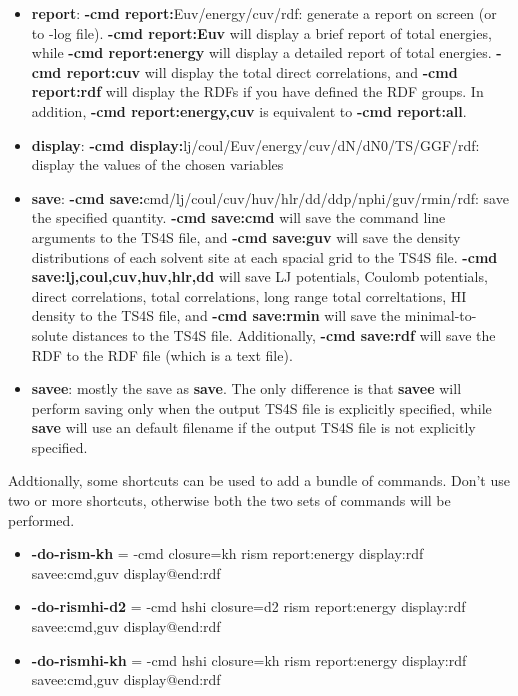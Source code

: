 \documentclass[aip,amsmath,amssymb,reprint,onecolumn]{revtex4-1}
\begin{document}
\begin{itemize}
    \item {\bf report}: {\bf -cmd report:}Euv/energy/cuv/rdf: generate a report on screen (or to -log file). {\bf -cmd report:Euv} will display a brief report of total energies, while {\bf -cmd report:energy} will display a detailed report of total energies. {\bf -cmd report:cuv} will display the total direct correlations, and {\bf -cmd report:rdf} will display the RDFs if you have defined the RDF groups. In addition, {\bf -cmd report:energy,cuv} is equivalent to {\bf -cmd report:all}.
    \item {\bf display}: {\bf -cmd display:}lj/coul/Euv/energy/cuv/dN/dN0/TS/GGF/rdf: display the values of the chosen variables
    \item {\bf save}: {\bf -cmd save:}cmd/lj/coul/cuv/huv/hlr/dd/ddp/nphi/guv/rmin/rdf: save the specified quantity. {\bf -cmd save:cmd} will save the command line arguments to the TS4S file, and {\bf -cmd save:guv} will save the density distributions of each solvent site at each spacial grid to the TS4S file. {\bf -cmd save:lj,coul,cuv,huv,hlr,dd} will save LJ potentials, Coulomb potentials, direct correlations, total correlations, long range total correltations, HI density to the TS4S file, and {\bf -cmd save:rmin} will save the minimal-to-solute distances to the TS4S file. Additionally, {\bf -cmd save:rdf} will save the RDF to the RDF file (which is a text file).
    \item {\bf savee}: mostly the save as {\bf save}. The only difference is that {\bf savee} will perform saving only when the output TS4S file is explicitly specified, while {\bf save} will use an default filename if the output TS4S file is not explicitly specified.
\end{itemize}

Addtionally, some shortcuts can be used to add a bundle of commands. Don't use two or more shortcuts, otherwise both the two sets of commands will be performed.

\begin{itemize}
    \item {\bf -do-rism-kh} = -cmd closure=kh rism report:energy display:rdf savee:cmd,guv display@end:rdf
    \item {\bf -do-rismhi-d2} = -cmd hshi closure=d2 rism report:energy display:rdf savee:cmd,guv display@end:rdf
    \item {\bf -do-rismhi-kh} = -cmd hshi closure=kh rism report:energy display:rdf savee:cmd,guv display@end:rdf
\end{itemize}
\end{document}

